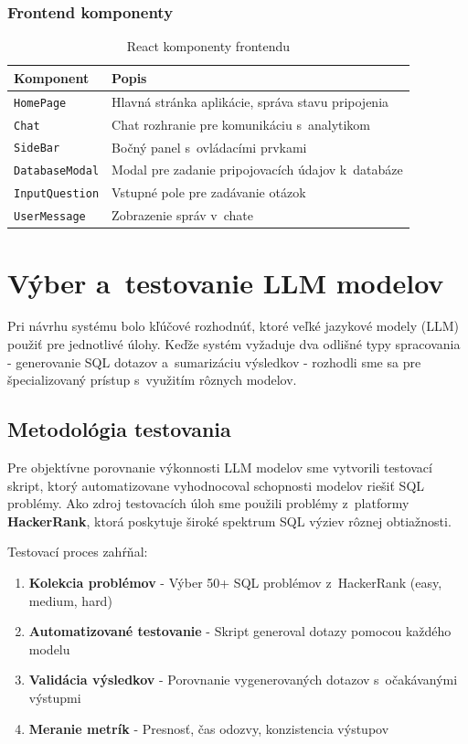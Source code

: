 \documentclass[a4paper, 12pt]{article}
\begin{document}
\subsubsection{Frontend komponenty}

\begin{table}[H]
\centering
\begin{tabular}{lp{9cm}}
\toprule
\textbf{Komponent} & \textbf{Popis} \\
\midrule
\texttt{HomePage} & Hlavná stránka aplikácie, správa stavu pripojenia \\
\texttt{Chat} & Chat rozhranie pre komunikáciu s~analytikom \\
\texttt{SideBar} & Bočný panel s~ovládacími prvkami \\
\texttt{DatabaseModal} & Modal pre zadanie pripojovacích údajov k~databáze \\
\texttt{InputQuestion} & Vstupné pole pre zadávanie otázok \\
\texttt{UserMessage} & Zobrazenie správ v~chate \\
\bottomrule
\end{tabular}
\caption{React komponenty frontendu}
\end{table}

\clearpage

\section{Výber a~testovanie LLM modelov}

Pri návrhu systému bolo kľúčové rozhodnúť, ktoré veľké jazykové modely (LLM) použiť pre jednotlivé úlohy. Keďže systém vyžaduje dva odlišné typy spracovania - generovanie SQL dotazov a~sumarizáciu výsledkov - rozhodli sme sa pre špecializovaný prístup s~využitím rôznych modelov.

\subsection{Metodológia testovania}

Pre objektívne porovnanie výkonnosti LLM modelov sme vytvorili testovací skript, ktorý automatizovane vyhodnocoval schopnosti modelov riešiť SQL problémy. Ako zdroj testovacích úloh sme použili problémy z~platformy \textbf{HackerRank}, ktorá poskytuje široké spektrum SQL výziev rôznej obtiažnosti.

Testovací proces zahŕňal:
\begin{enumerate}
    \item \textbf{Kolekcia problémov} - Výber 50+ SQL problémov z~HackerRank (easy, medium, hard)
    \item \textbf{Automatizované testovanie} - Skript generoval dotazy pomocou každého modelu
    \item \textbf{Validácia výsledkov} - Porovnanie vygenerovaných dotazov s~očakávanými výstupmi
    \item \textbf{Meranie metrík} - Presnosť, čas odozvy, konzistencia výstupov
\end{enumerate}
\end{document}
